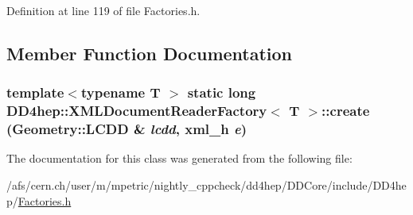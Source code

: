 Definition at line 119 of file Factories.h.

\subsection{Member Function Documentation}
\hypertarget{class_d_d4hep_1_1_x_m_l_document_reader_factory_aa504d333a2f40d12a83d0f2d2585938f}{
\subsubsection[{create}]{\setlength{\rightskip}{0pt plus 5cm}template$<$typename T $>$ static long {\bf DD4hep::XMLDocumentReaderFactory}$<$ {\bf T} $>$::create ({\bf Geometry::LCDD} \& {\em lcdd}, \/  {\bf xml\_\-h} {\em e})}}
\label{class_d_d4hep_1_1_x_m_l_document_reader_factory_aa504d333a2f40d12a83d0f2d2585938f}


The documentation for this class was generated from the following file:\begin{DoxyCompactItemize}
\item 
/afs/cern.ch/user/m/mpetric/nightly\_\-cppcheck/dd4hep/DDCore/include/DD4hep/\hyperlink{_d_d_core_2include_2_d_d4hep_2_factories_8h}{Factories.h}\end{DoxyCompactItemize}
